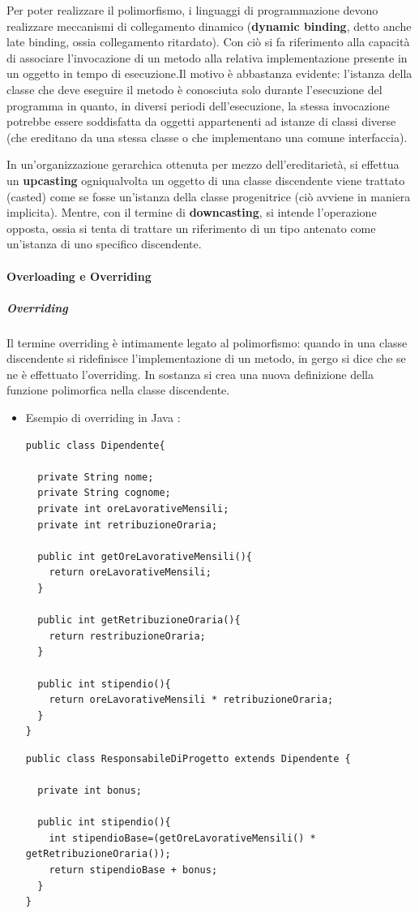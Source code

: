 Per poter realizzare il polimorfismo, i linguaggi di programmazione devono realizzare meccanismi di collegamento dinamico (\textbf{dynamic binding}, detto anche late binding, ossia collegamento ritardato). Con ciò si fa riferimento alla capacità di associare l'invocazione di un metodo alla relativa implementazione presente in un oggetto in tempo di esecuzione.Il motivo è abbastanza evidente: l'istanza della classe che deve eseguire il metodo è conosciuta solo durante l'esecuzione del programma in quanto, in diversi periodi dell'esecuzione, la stessa invocazione potrebbe essere soddisfatta da oggetti appartenenti ad istanze di classi diverse (che ereditano da una stessa classe o che implementano una comune interfaccia).

In un'organizzazione gerarchica ottenuta per mezzo dell'ereditarietà, si effettua un \textbf{upcasting} ogniqualvolta un oggetto di una classe discendente viene trattato (casted) come se fosse un'istanza della classe progenitrice (ciò avviene in maniera implicita). Mentre, con il termine di \textbf{downcasting}, si intende l'operazione opposta, ossia si tenta di trattare un riferimento di un tipo antenato come un'istanza di uno specifico discendente.

\paragraph{Overloading e Overriding}

\subparagraph{Overriding}

Il termine overriding è intimamente legato al polimorfismo: quando in una classe discendente si ridefinisce l'implementazione di un metodo, in gergo si dice che se ne è effettuato l'overriding. In sostanza si crea una nuova definizione della funzione polimorfica nella classe discendente.


    \begin{itemize}
    \item Esempio di overriding in Java :
    \begin{lstlisting}
public class Dipendente{
	
  private String nome;
  private String cognome;
  private int oreLavorativeMensili;
  private int retribuzioneOraria;

  public int getOreLavorativeMensili(){
    return oreLavorativeMensili;
  }
    
  public int getRetribuzioneOraria(){
    return restribuzioneOraria;
  }

  public int stipendio(){
    return oreLavorativeMensili * retribuzioneOraria;
  }  
}
\end{lstlisting}

    \begin{lstlisting}
public class ResponsabileDiProgetto extends Dipendente {

  private int bonus;

  public int stipendio(){
    int stipendioBase=(getOreLavorativeMensili() * getRetribuzioneOraria());
    return stipendioBase + bonus;
  }
}
\end{lstlisting}
\end{itemize}


